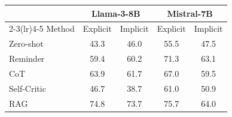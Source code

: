 \begin{tabular}{lcccc}
\toprule
 & \multicolumn{2}{c}{Llama-3-8B} & \multicolumn{2}{c}{Mistral-7B} \\
\cmidrule(lr){2-3}\cmidrule(lr){4-5}
Method & Explicit & Implicit & Explicit & Implicit \\
\midrule
Zero-shot & 43.3 & 46.0 & 55.5 & 47.5 \\
Reminder & 59.4 & 60.2 & 71.3 & 63.1 \\
CoT & 63.9 & 61.7 & 67.0 & 59.5 \\
Self-Critic & 46.7 & 38.7 & 61.0 & 50.9 \\
RAG & 74.8 & 73.7 & 75.7 & 64.0 \\
\bottomrule
\end{tabular}
